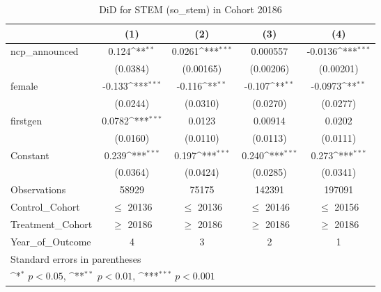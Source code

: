 \begin{table}[htbp]\centering
\def\sym#1{\ifmmode^{#1}\else\(^{#1}\)\fi}
\caption{DiD for STEM (so\_stem) in Cohort 20186}
\begin{tabular}{l*{4}{c}}
\toprule
                &\multicolumn{1}{c}{(1)}         &\multicolumn{1}{c}{(2)}         &\multicolumn{1}{c}{(3)}         &\multicolumn{1}{c}{(4)}         \\
\midrule
ncp\_announced   &    0.124\sym{**} &   0.0261\sym{***}& 0.000557         &  -0.0136\sym{***}\\
                & (0.0384)         &(0.00165)         &(0.00206)         &(0.00201)         \\
\addlinespace
female          &   -0.133\sym{***}&   -0.116\sym{**} &   -0.107\sym{**} &  -0.0973\sym{**} \\
                & (0.0244)         & (0.0310)         & (0.0270)         & (0.0277)         \\
\addlinespace
firstgen        &   0.0782\sym{***}&   0.0123         &  0.00914         &   0.0202         \\
                & (0.0160)         & (0.0110)         & (0.0113)         & (0.0111)         \\
\addlinespace
Constant        &    0.239\sym{***}&    0.197\sym{***}&    0.240\sym{***}&    0.273\sym{***}\\
                & (0.0364)         & (0.0424)         & (0.0285)         & (0.0341)         \\
\midrule
Observations    &    58929         &    75175         &   142391         &   197091         \\
Control\_Cohort  &$\le$ 20136         &$\le$ 20136         &$\le$ 20146         &$\le$ 20156         \\
Treatment\_Cohort&$\ge$ 20186         &$\ge$ 20186         &$\ge$ 20186         &$\ge$ 20186         \\
Year\_of\_Outcome &        4         &        3         &        2         &        1         \\
\bottomrule
\multicolumn{5}{l}{\footnotesize Standard errors in parentheses}\\
\multicolumn{5}{l}{\footnotesize \sym{*} \(p<0.05\), \sym{**} \(p<0.01\), \sym{***} \(p<0.001\)}\\
\end{tabular}
\end{table}
